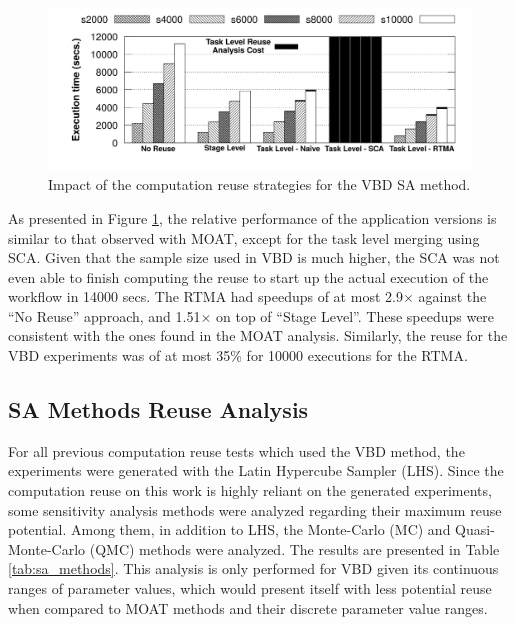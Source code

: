 \begin{figure}[t]
\begin{center}
	\includegraphics[width=1\textwidth]{img/vbd-reuse}
	\caption{Impact of the computation reuse strategies for the VBD SA method.}
	\label{fig:vbd}
\end{center}
\vspace*{-3ex}
\end{figure}

As presented in Figure \ref{fig:vbd}, the relative performance of the application versions is similar to that observed with MOAT, except for the task level merging using SCA. Given that the sample size used in VBD is much higher, the SCA was not even able to finish computing the reuse to start up the actual execution of the workflow in 14000 secs. The RTMA had speedups of at most 2.9$\times$ against the ``No Reuse'' approach, and 1.51$\times$ on top of ``Stage Level''. These speedups were consistent with the ones found in the MOAT analysis. Similarly, the reuse for the VBD experiments was of at most 35\% for 10000 executions for the RTMA.

\subsection{SA Methods Reuse Analysis}
\label{sec:methods_results}

For all previous computation reuse tests which used the VBD method, the experiments were generated with the Latin Hypercube Sampler (LHS). Since the computation reuse on this work is highly reliant on the generated experiments, some sensitivity analysis methods were analyzed regarding their maximum reuse potential. Among them, in addition to LHS, the Monte-Carlo (MC) and Quasi-Monte-Carlo (QMC) methods were analyzed. The results are presented in Table \ref{tab:sa_methods}. This analysis is only performed for VBD given its continuous ranges of parameter values, which would present itself with less potential reuse when compared to MOAT methods and their discrete parameter value ranges.

